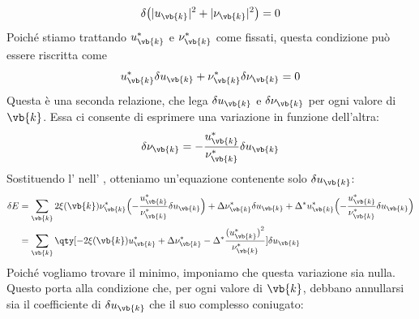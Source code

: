 \begin{equation*}
   \delta \bigl( |u_{\vb{k}}|^2 + |\nu_{\vb{k}}|^2 \bigr)
   =0
\end{equation*}
Poiché stiamo trattando $u_{\vb{k}}^*$ e $\nu_{\vb{k}}^*$ come fissati, questa condizione può essere riscritta come
\begin{equation*}
   u_{\vb{k}}^* \delta u_{\vb{k}}
   +
   \nu_{\vb{k}}^* \delta \nu_{\vb{k}}
   =0
\end{equation*}
Questa è una seconda relazione, che lega $\delta u_{\vb{k}}$ e $\delta \nu_{\vb{k}}$ per ogni valore di $\vb{k}$. Essa ci consente di esprimere una variazione in funzione dell'altra:
\begin{equation}
   \delta \nu_{\vb{k}}
   =-\frac{u_{\vb{k}}^*}{\nu_{\vb{k}}^*} \delta u_{\vb{k}}
   \label{eq:variation_normalization}
\end{equation}
Sostituendo l' nell' , otteniamo un'equazione contenente solo $\delta u_{\vb{k}}$:
\begin{equation*}
   \begin{split}
      \delta E
      & =\sum_{\vb{k}}
      2\xi(\vb{k}) \nu_{\vb{k}}^*
      \Bigl( -\frac{u_{\vb{k}}^*}{\nu_{\vb{k}}^*} \delta u_{\vb{k}} \Bigr)
      + \Delta \nu_{\vb{k}}^* \delta u_{\vb{k}}
      + \Delta^* u_{\vb{k}}^*
      \Bigl( -\frac{u_{\vb{k}}^*}{\nu_{\vb{k}}^*} \delta u_{\vb{k}} \Bigr)
      \\
      & =\sum_{\vb{k}}
      \qty[
      -2\xi(\vb{k}) u_{\vb{k}}^*
      + \Delta \nu_{\vb{k}}^*
      - \Delta^* \frac{{(u_{\vb{k}}^*)}^2}{\nu_{\vb{k}}^*}
      ]
      \delta u_{\vb{k}}
   \end{split}
\end{equation*}
Poiché vogliamo trovare il minimo, imponiamo che questa variazione sia nulla. Questo porta alla condizione che, per ogni valore di $\vb{k}$, debbano annullarsi sia il coefficiente di $\delta u_{\vb{k}}$ che il suo complesso coniugato:
